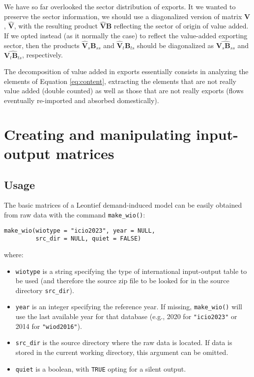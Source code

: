 We have so far overlooked the sector distribution of exports. It we wanted to
preserve the sector information, we should use a diagonalized version of matrix
\(\mathbf{V}\), \(\hat{\mathbf{V}}\), with the resulting product \(\hat{\mathbf{V}} \mathbf{B}\) reflecting the sector of origin of value added. If we opted instead
(as it normally the case) to reflect the value-added exporting sector, then the
products \({\hat{\mathbf{V}}}_s \mathbf{B}_{ss}\) and \({\hat{\mathbf{V}}}_t \mathbf{B}_{ts}\) should be diagonalized as \(\widehat{{\mathbf{V}}_s \mathbf{B}_{ss}}\) and \(\widehat{{\mathbf{V}}_t \mathbf{B}_{ts}}\), respectively.

The decomposition of value added in exports essentially consists in
analyzing the elements of Equation \eqref{eq:content}, extracting the elements
that are not really value added (double counted) as well as those that are
not really exports (flows eventually re-imported and absorbed domestically).

\hypertarget{creating-and-manipulating-input-output-matrices}{%
\section{Creating and manipulating input-output matrices}\label{creating-and-manipulating-input-output-matrices}}

\hypertarget{usage}{%
\subsection{Usage}\label{usage}}

The basic matrices of a Leontief demand-induced model can be easily obtained
from raw data with the command \texttt{make\_wio()}:

\begin{verbatim}
make_wio(wiotype = "icio2023", year = NULL, 
         src_dir = NULL, quiet = FALSE)
\end{verbatim}

where:

\begin{itemize}
\tightlist
\item
  \texttt{wiotype} is a string specifying the type of international input-output table
  to be used (and therefore the source zip file to be looked for in the source
  directory \texttt{src\_dir}).
\item
  \texttt{year} is an integer specifying the reference year. If missing, \texttt{make\_wio()}
  will use the last available year for that database (e.g., 2020 for
  \texttt{"icio2023"} or 2014 for \texttt{"wiod2016"}).
\item
  \texttt{src\_dir} is the source directory where the raw data is located. If data is
  stored in the current working directory, this argument can be omitted.
\item
  \texttt{quiet} is a boolean, with \texttt{TRUE} opting for a silent output.
\end{itemize}

